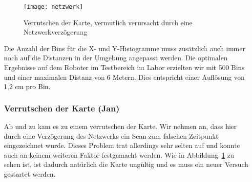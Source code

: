 \begin{figure}
	\centering
	\texttt{[image: netzwerk]}
	\caption{Verrutschen der Karte, vermutlich verursacht durch eine Netzwerkverzögerung}
	\label{fig:netzwerk}
\end{figure}

Die Anzahl der Bins für die X- und Y-Histogramme muss zusätzlich auch immer noch auf die Distanzen in der Umgebung angepasst werden. Die optimalen Ergebnisse auf dem Roboter im Testbereich im Labor erzielten wir mit 500 Bins und einer maximalen Distanz von 6 Metern. Dies entspricht einer Auflösung von 1,2 cm pro Bin.

\subsubsection{Verrutschen der Karte (Jan)}

Ab und zu kam es zu einem verrutschen der Karte. Wir nehmen an, dass hier durch eine Verzögerung des Netzwerks ein Scan zum falschen Zeitpunkt eingezeichnet wurde. Dieses Problem trat allerdings sehr selten auf und konnte auch an keinem weiteren Faktor festgemacht werden. Wie in Abbildung~\ref{fig:netzwerk} zu sehen ist, ist dadurch natürlich die Karte ungültig und es muss ein neuer Versuch gestartet werden.
